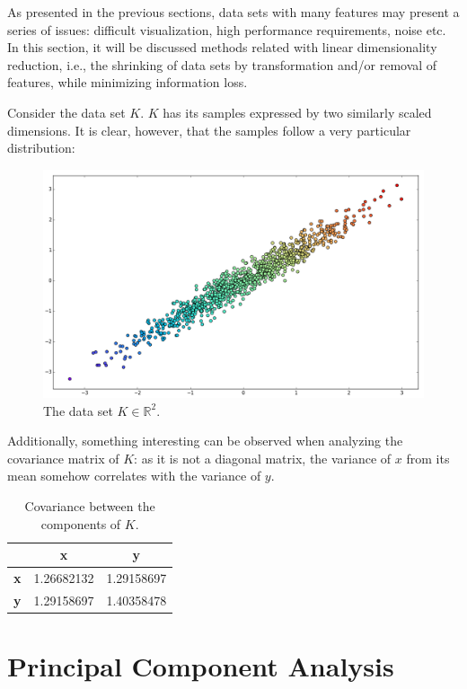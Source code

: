 \documentclass[12pt]{report}
\begin{document}
As presented in the previous sections, data sets with many features may present a series of issues: difficult visualization, high performance requirements, noise etc. In this section, it will be discussed methods related with linear dimensionality reduction, i.e., the shrinking of data sets by transformation and/or removal of features, while minimizing information loss.

Consider the data set $K$. $K$ has its samples expressed by two similarly scaled dimensions. It is clear, however, that the samples follow a very particular distribution:

\begin{figure}[H]
    \centering
	\captionsetup{justification=centering}

	\includegraphics[width=.8\linewidth]{datasets/r}
	\caption{The data set $K \in \mathbb{R}^2$.}
	\label{fig:datasetr}
\end{figure}

Additionally, something interesting can be observed when analyzing the covariance matrix of $K$: as it is not a diagonal matrix, the variance of $x$ from its mean somehow correlates with the variance of $y$. \cite{pcajon2003}

\begin{table}[H]
	\centering
	\begin{tabular}{|c|c|c|}
		\hline
			& \textbf{x} & \textbf{y} \\\hline
		\textbf{x} & 1.26682132  & 1.29158697 \\\hline
		\textbf{y} & 1.29158697  & 1.40358478 \\\hline
	\end{tabular}
	\caption{Covariance between the components of $K$.}
\end{table}

\section{Principal Component Analysis}
\end{document}
